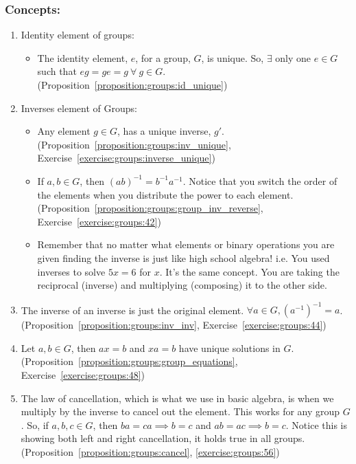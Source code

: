\subsubsection*{Concepts:}
\begin{enumerate}
\item 
Identity element of groups: 
	\begin{itemize}
	\item
	The identity element, $e$, for a group, $G$, is unique. So, $\exists$ only one $e \in G$ such that $eg = ge = g\  \forall\  g \in G$. (Proposition~\ref{proposition:groups:id_unique})
	\end{itemize}
\item
Inverses element of Groups:
	\begin{itemize}
	\item
	Any element $g \in G$, has a unique inverse, $g'$. (Proposition~\ref{proposition:groups:inv_unique}, Exercise~\ref{exercise:groups:inverse_unique})
	
	\item
	If $a, b \in G$, then $(ab)^{-1} = b^{-1}a^{-1}$. Notice that you switch the order of the elements when you distribute the power to each element. (Proposition~\ref{proposition:groups:group_inv_reverse}, Exercise~\ref{exercise:groups:42})

	\item
	Remember that no matter what elements or binary operations you are given finding the inverse is just like high school algebra! i.e. You used inverses to solve $5x = 6$ for $x$.  It's the same concept. You are taking the reciprocal (inverse) and multiplying (composing) it to the other side.
	\end{itemize}

\item
The inverse of an inverse is just the original element.  $\forall a \in G, (a^{-1})^{-1} = a$. (Proposition~\ref{proposition:groups:inv_inv}, Exercise~\ref{exercise:groups:44})

\item
Let $a, b \in G$, then $ax = b$ and $xa = b$ have unique solutions in $G$. (Proposition~\ref{proposition:groups:group_equations}, Exercise~\ref{exercise:groups:48})

\item
The law of cancellation, which is what we use in basic algebra, is when we multiply by the inverse to cancel out the element.  This works for any group $G$.  So, if $a, b, c \in G$, then $ba = ca \implies b = c$ and $ab = ac \implies b = c$. Notice this is showing both left and right cancellation, it holds true in all groups. (Proposition~\ref{proposition:groups:cancel}, \ref{exercise:groups:56})


\end{enumerate}
